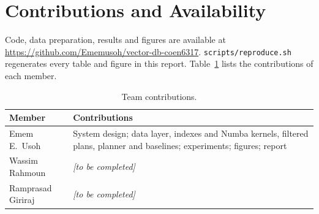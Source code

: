 \documentclass[sigconf,nonacm]{acmart}
\newcommand{\repo}{\url{https://github.com/Ememusoh/vector-db-coen6317}}
\begin{document}
\section{Contributions and Availability}

Code, data preparation, results and figures are available at \repo. \texttt{scripts/reproduce.sh} regenerates every table and figure in this report. Table~\ref{tab:contrib} lists the contributions of each member.

\begin{table}[t]
\centering\small
\caption{Team contributions.}
\label{tab:contrib}
\begin{tabular}{p{}p{}}
\toprule
Member & Contributions \\
\midrule
Emem E.\ Usoh & System design; data layer, indexes and Numba kernels, filtered plans, planner and baselines; experiments; figures; report \\
Wassim Rahmoun & \textit{[to be completed]} \\
Ramprasad Giriraj & \textit{[to be completed]} \\
\bottomrule
\end{tabular}
\end{table}



\end{document}
